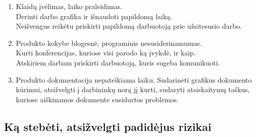 \documentclass[a4paper,12pt]{article}
\begin{document}
\begin{enumerate}
	\item Klaid\k u \k iv\. elimas, laiko praleidimas.\\
  		Derinti darbo grafika ir i\v snaudoti papildom\k a laik\k a. \\
  		Neišvengus reik\. etu priskirti papildom\k a darbuotoj\k a prie u\v zsitesusio darbo.
  		
  		
	\item Produkto kokybe blogesn\. e,	programinis nesusiderinamumas. \\ 
  		Kurti konferencijas, kuriose visi parodo k\k a \k ivykd\. e,  ir kaip. \\
  		Atskiriem darbam priskirti darbuotoj\k a, kuris sugeba komunikuoti.
  
	\item Produkto dokumentacija nepateikiama laiku.
  		Sudarin\. eti grafikus dokumento k\= urimui, atsi\v zvelgti \k i darbinink\k u nor\k a
  		j\k i kurti, sudaryti atsiskaitym\k u ta\v skus, kuriose ai\v skinamos dokumente 
  		susidurtos problemos.
  		
\end{enumerate}

\subsection{K\k a steb\. eti, atsi\v zvelgti padid\. ejus rizikai}
\end{document}
